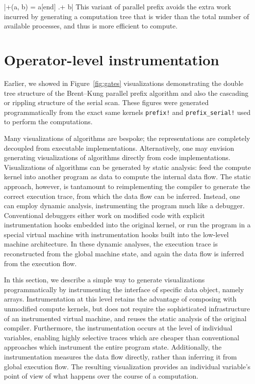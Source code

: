 \documentclass{sig-alternate}
\newcommand{\code}[1]{\texttt{#1}}
\begin{document}
|+(a, b) = a[end] .+ b|
%
This variant of parallel prefix avoids the extra work incurred by generating a
computation tree that is wider than the total number of available processes,
and thus is more efficient to compute.

\section{Operator-level instrumentation}

Earlier, we showed in Figure~\ref{fig:gates} visualizations demonstrating the
double tree structure of the Brent--Kung parallel prefix algorithm and also the
cascading or rippling structure of the serial scan. These figures were
generated programmatically from the exact same kernels \code{prefix!} and
\code{prefix\_serial!} used to perform the computations.

Many visualizations of algorithms are bespoke; the representations are
completely decoupled from executable implementations. Alternatively, one may
envision generating visualizations of algorithms directly from code
implementations. Visualizations of algorithms can be generated by static
analysis: feed the compute kernel into another program as data to compute the
internal data flow. The static approach, however, is tantamount to
reimplementing the compiler to generate the correct execution trace, from which
the data flow can be inferred. Instead, one can employ dynamic analysis,
instrumenting the program much like a debugger. Conventional debuggers either
work on modified code with explicit instrumentation hooks embedded into the
original kernel, or run the program in a special virtual machine with
instrumentation hooks built into the low-level machine architecture. In these
dynamic analyses, the execution trace is reconstructed from the global machine
state, and again the data flow is inferred from the execution flow.

In this section, we describe a simple way to generate visualizations
programmatically by instrumenting the interface of specific data object, namely
arrays. Instrumentation at this level retains the advantage of composing with
unmodified compute kernels, but does not require the sophisticated
infrastructure of an instrumented virtual machine, and reuses the static
analysis of the original compiler. Furthermore, the instrumentation occurs at
the level of individual variables, enabling highly selective traces
which are cheaper than conventional approaches which instrument the entire
program state. Additionally, the instrumentation measures the data flow
directly, rather than inferring it from global execution flow. The resulting
visualization provides an individual variable's point of view of what happens
over the course of a computation.
\end{document}
